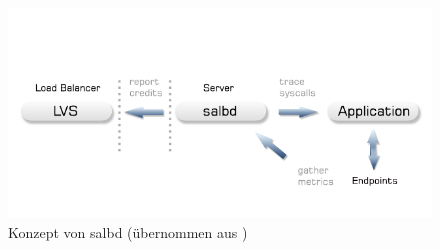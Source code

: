 \documentclass[a4paper, 12pt, BCOR10mm, DIV12, toc=bibliography, toc=listof, german]{scrbook}
\begin{document}
		\begin{figure}
			\centering
			\includegraphics[width=\textwidth]{images/salbd-concept}
			\caption{Konzept von salbd (übernommen aus \cite{zinke2012})}
			\label{fig:salbd}
		\end{figure}
		
	







	
	$~$\\
\end{document}
